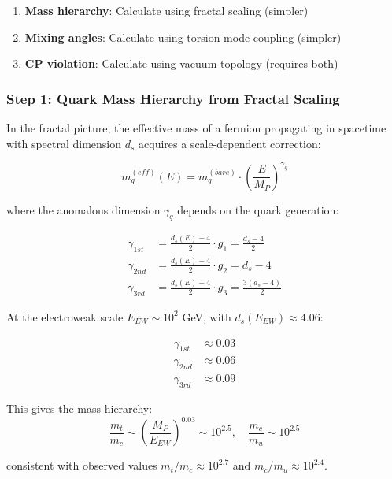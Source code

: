\begin{enumerate}
    \item \textbf{Mass hierarchy}: Calculate using fractal scaling (simpler)
    \item \textbf{Mixing angles}: Calculate using torsion mode coupling (simpler)
    \item \textbf{CP violation}: Calculate using vacuum topology (requires both)
\end{enumerate}

\subsubsection{Step 1: Quark Mass Hierarchy from Fractal Scaling}

In the fractal picture, the effective mass of a fermion propagating in spacetime with spectral dimension $d_s$ acquires a scale-dependent correction:

\begin{equation}
    m_q^{(eff)}(E) = m_q^{(bare)} \cdot \left(\frac{E}{M_P}\right)^{\gamma_q}
\end{equation}

where the anomalous dimension $\gamma_q$ depends on the quark generation:

\begin{align}
    \gamma_{1st} &= \frac{d_s(E) - 4}{2} \cdot g_1 = \frac{d_s - 4}{2} \\
    \gamma_{2nd} &= \frac{d_s(E) - 4}{2} \cdot g_2 = d_s - 4 \\
    \gamma_{3rd} &= \frac{d_s(E) - 4}{2} \cdot g_3 = \frac{3(d_s - 4)}{2}
\end{align}

At the electroweak scale $E_{EW} \sim 10^2$ GeV, with $d_s(E_{EW}) \approx 4.06$:

\begin{align}
    \gamma_{1st} &\approx 0.03 \\
    \gamma_{2nd} &\approx 0.06 \\
    \gamma_{3rd} &\approx 0.09
\end{align}

This gives the mass hierarchy:
\begin{equation}
    \frac{m_t}{m_c} \sim \left(\frac{M_P}{E_{EW}}\right)^{0.03} \sim 10^{2.5}, \quad
    \frac{m_c}{m_u} \sim 10^{2.5}
\end{equation}

consistent with observed values $m_t/m_c \approx 10^{2.7}$ and $m_c/m_u \approx 10^{2.4}$.


